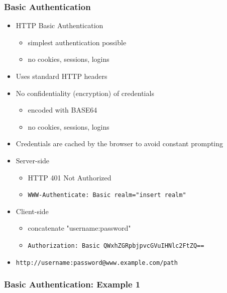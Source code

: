 \documentclass{beamer}
\begin{document}
\begin{frame}\frametitle{Basic Authentication} 

  \begin{itemize}
    \item HTTP Basic Authentication
    \begin{itemize}
      \item simplest authentication possible
      \item no cookies, sessions, logins
    \end{itemize}

    \item Uses standard HTTP headers
    \item No confidentiality (encryption) of credentials
    \begin{itemize}
      \item encoded with BASE64
      \item no cookies, sessions, logins
    \end{itemize}

    \item Credentials are cached by the browser to avoid constant prompting
    
    \item Server-side
    \begin{itemize}
      \item HTTP 401 Not Authorized
      \item \texttt{WWW-Authenticate: Basic realm="insert realm"}
    \end{itemize}

    \item Client-side
    \begin{itemize}
      \item concatenate "username:password"
      \item \texttt{Authorization: Basic QWxhZGRpbjpvcGVuIHNlc2FtZQ==}
    \end{itemize}

    \item \texttt{http://username:password@www.example.com/path}

  \end{itemize}
  
\end{frame}



\begin{frame}[fragile]\frametitle{Basic Authentication: Example 1} 

  
    
\end{frame}
\end{document}
